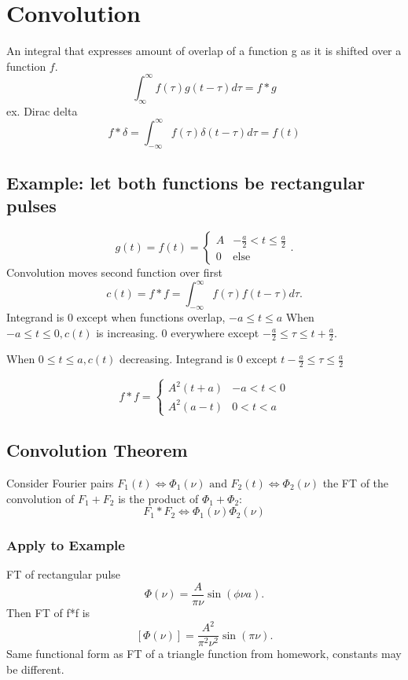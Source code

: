 \section{Convolution}
An integral that expresses amount of overlap of a function g as it is shifted over a function $ f $.
\begin{equation}
	\int_{\infty}^{\infty}f(\tau)g(t-\tau)d\tau=f*g
\end{equation}
ex. Dirac delta
\begin{equation}
	f*\delta=\int_{-\infty}^{\infty}f(\tau)\delta(t-\tau)d\tau=f(t)
\end{equation}

\subsection{Example: let both functions be rectangular pulses}
\[
g(t)=f(t)=
\begin{cases}
	A & -\frac{a}{2}<t\leq \frac{a}{2}\\
	0 & \mbox{else}\end{cases}.\] 
Convolution moves second function over first
\[
c(t)=f*f=\int_{-\infty}^{\infty}f(\tau)f(t-\tau)d\tau.\] 
Integrand is $ 0 $ except when functions overlap, $ -a\leq t\leq a $ When $ -a\leq t\leq 0, c(t) $ is increasing. 0 everywhere except $ -\frac{a}{2}\leq\tau\leq t+\frac{a}{2} $.

When $ 0\leq t\leq a, c(t) $ decreasing. Integrand is $ 0 $ except $ t- \frac{a}{2}\leq\tau\leq \frac{a}{2} $


\begin{equation}
	f*f=
	\begin{cases}
		A^2(t+a) & -a<t<0\\
		A^2(a-t) & 0<t<a
	\end{cases}
\end{equation}

\subsection{Convolution Theorem}
Consider Fourier pairs $ F_1(t)\Leftrightarrow\Phi_1(\nu) \text{ and } F_2(t)\Leftrightarrow\Phi_2(\nu) $ the FT of the convolution of $ F_1+F_2 $ is the product of $ \Phi_1 + \Phi_2 $: 
\begin{equation}
	F_1*F_2\Leftrightarrow\Phi_1(\nu)\Phi_2(\nu)
\end{equation}
\subsubsection{Apply to Example}
FT of rectangular pulse \[
\Phi(\nu)=\frac{A}{\pi\nu}\sin(\phi\nu a).\] 
Then FT of f*f is 
\[ [\Phi(\nu)]=\frac{A^2}{\pi^2\nu^2}\sin(\pi\nu ).\] 
Same functional form as FT of a triangle function from homework, constants may be different.

